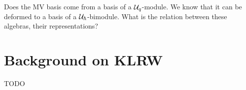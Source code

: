 \documentclass[11pt]{article}
\begin{document}
Does the MV basis come from a basis of a $\mathcal U_q$-module. We know that it can be deformed to a basis of a $\mathcal U_\hbar$-bimodule. What is the relation between these algebras, their representations? 


\begin{comment}
{\color{red} Joel says:} what do you mean by the $ \CC^\times$ action and the $ T$ action?  Careful that you are not getting confused with the actioin on the MV cycles (the action used for the multidegrees).  There is a $ T $ action on $L(\lambda)$ and one on $ \CC[N]$, and the map $ L(\lambda) \rightarrow \CC[N]$ is equivariant, up to a character.

It may be helpful to recall that if $Z$ is stable of type $\nu$ then $b_Z$ is unique such that whenever $\nu + \mu \in P_+$ 
$$
t^\mu Z \subset \overline{\Gr^{\nu + \mu }} \Rightarrow b_Z = \Psi_{\nu + \mu}([t^\mu Z])
$$
\end{comment}

% 

% 

\section{Background on KLRW}
% 
TODO 
%
%


%
%


%
\end{document}
